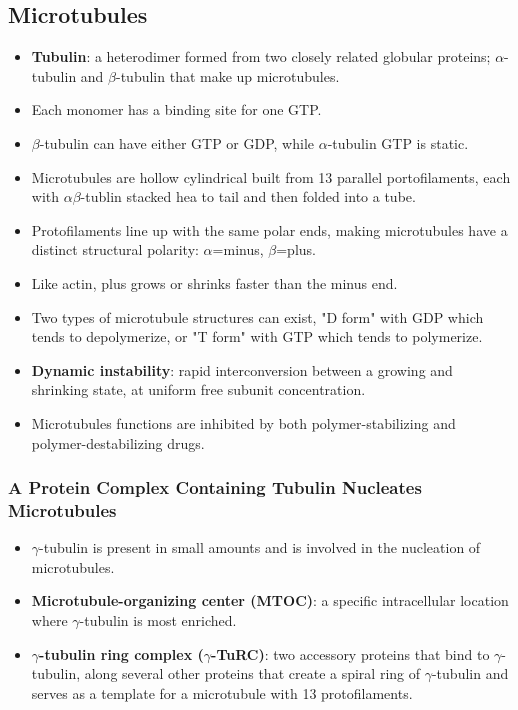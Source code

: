 \documentclass[12pt,a4paper]{article}
\begin{document}
\subsection{Microtubules}
\begin{itemize}
    \item \textbf{Tubulin}: a heterodimer formed from two closely related globular proteins; $\alpha$-tubulin and $\beta$-tubulin that make up microtubules.
    \item Each monomer has a binding site for one GTP.
    \item $\beta$-tubulin can have either GTP or GDP, while $\alpha$-tubulin GTP is static.
    \item Microtubules are hollow cylindrical built from 13 parallel portofilaments, each with $\alpha$$\beta$-tublin stacked hea to tail and then folded into a tube.
    \item Protofilaments line up with the same polar ends, making microtubules have a distinct structural polarity: $\alpha$=minus, $\beta$=plus.
    \item Like actin, plus grows or shrinks faster than the minus end.
    \item Two types of microtubule structures can exist, "D form" with GDP which tends to depolymerize, or "T form" with GTP which tends to polymerize.
    \item \textbf{Dynamic instability}: rapid interconversion between a growing and shrinking state, at uniform free subunit concentration. 
    \item Microtubules functions are inhibited by both polymer-stabilizing and polymer-destabilizing drugs.
\end{itemize}
\subsubsection{A Protein Complex Containing Tubulin Nucleates Microtubules}
\begin{itemize}
    \item $\gamma$-tubulin is present in small amounts and is involved in the nucleation of microtubules.
    \item \textbf{Microtubule-organizing center (MTOC)}: a specific intracellular location where $\gamma$-tubulin is most enriched.
    \item \textbf{$\gamma$-tubulin ring complex ($\gamma$-TuRC)}: two accessory proteins that bind to $\gamma$-tubulin, along several other proteins that create a spiral ring of $\gamma$-tubulin and serves as a template for a microtubule with 13 protofilaments.
\end{itemize}
\end{document}
